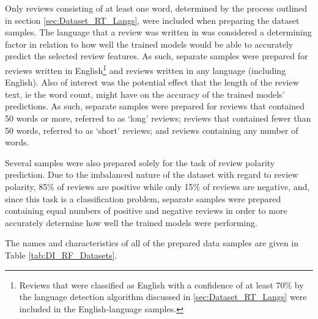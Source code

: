 Only reviews consisting of at least one word, determined by the process outlined in section \ref{sec:Dataset_RT_Langs}, were included when preparing the dataset samples. The language that a review was written in was considered a determining factor in relation to how well the trained models would be able to accurately predict the selected review features. As such, separate samples were prepared for reviews written in English\footnote{Reviews that were classified as English with a confidence of at least 70\% by the language detection algorithm discussed in \ref{sec:Dataset_RT_Langs} were included in the English-language samples.} and reviews written in any language (including English). Also of interest was the potential effect that the length of the review text, ie the word count, might have on the accuracy of the trained models' predictions. As such, separate samples were prepared for reviews that contained 50 words or more, referred to as `long' reviews; reviews that contained fewer than 50 words, referred to as `short' reviews; and reviews containing any number of words.

Several samples were also prepared solely for the task of review polarity prediction. Due to the imbalanced nature of the dataset with regard to review polarity, 85\% of reviews are positive while only 15\% of reviews are negative, and, since this task is a classification problem, separate samples were prepared containing equal numbers of positive and negative reviews in order to more accurately determine how well the trained models were performing.

The names and characteristics of all of the prepared data samples are given in Table \ref{tab:DI_RF_Datasets}.

